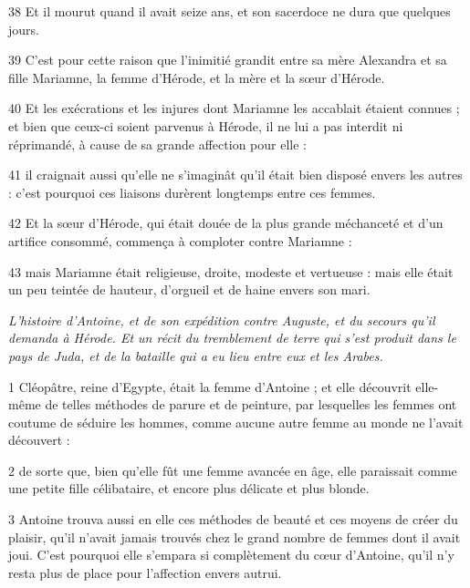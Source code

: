 \par 38 Et il mourut quand il avait seize ans, et son sacerdoce ne dura que quelques jours.

\par 39 C'est pour cette raison que l'inimitié grandit entre sa mère Alexandra et sa fille Mariamne, la femme d'Hérode, et la mère et la sœur d'Hérode.

\par 40 Et les exécrations et les injures dont Mariamne les accablait étaient connues ; et bien que ceux-ci soient parvenus à Hérode, il ne lui a pas interdit ni réprimandé, à cause de sa grande affection pour elle :

\par 41 il craignait aussi qu'elle ne s'imaginât qu'il était bien disposé envers les autres : c'est pourquoi ces liaisons durèrent longtemps entre ces femmes.

\par 42 Et la sœur d'Hérode, qui était douée de la plus grande méchanceté et d'un artifice consommé, commença à comploter contre Mariamne :

\par 43 mais Mariamne était religieuse, droite, modeste et vertueuse : mais elle était un peu teintée de hauteur, d'orgueil et de haine envers son mari.


\par \textit{L'histoire d'Antoine, et de son expédition contre Auguste, et du secours qu'il demanda à Hérode. Et un récit du tremblement de terre qui s'est produit dans le pays de Juda, et de la bataille qui a eu lieu entre eux et les Arabes.}

\par 1 Cléopâtre, reine d'Egypte, était la femme d'Antoine ; et elle découvrit elle-même de telles méthodes de parure et de peinture, par lesquelles les femmes ont coutume de séduire les hommes, comme aucune autre femme au monde ne l'avait découvert :

\par 2 de sorte que, bien qu'elle fût une femme avancée en âge, elle paraissait comme une petite fille célibataire, et encore plus délicate et plus blonde.

\par 3 Antoine trouva aussi en elle ces méthodes de beauté et ces moyens de créer du plaisir, qu'il n'avait jamais trouvés chez le grand nombre de femmes dont il avait joui. C'est pourquoi elle s'empara si complètement du cœur d'Antoine, qu'il n'y resta plus de place pour l'affection envers autrui.

